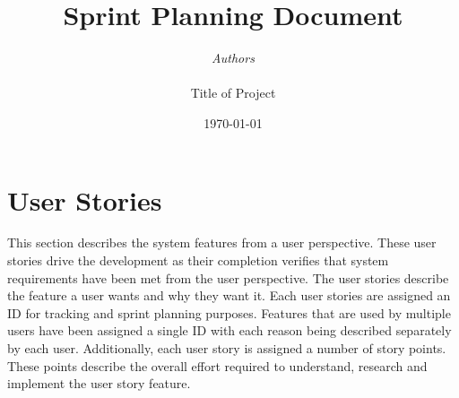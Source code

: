 \documentclass[11pt]{article}
\begin{document}

\thispagestyle{empty}
\title{{\LARGE\bf Sprint Planning Document}}
\author{{\Large\it Authors} \\
\vspace*{2.5in} 
\mbox{} \\
{\Large Title of Project}
\vspace*{2.5in} 
\mbox{} \\
\date{\today}
}
\maketitle


%

\section{User Stories}
This section describes the system features from a user perspective. These user stories drive the development as their completion verifies that system requirements have been met from the user perspective. The user stories describe the feature a user wants and why they want it. Each user stories are assigned an ID for tracking and sprint planning purposes. Features that are used by multiple users have been assigned a single ID with each reason being described separately by each user. Additionally, each user story is assigned a number of story points. These points describe the overall effort required to understand, research and implement the user story feature.
\end{document}
